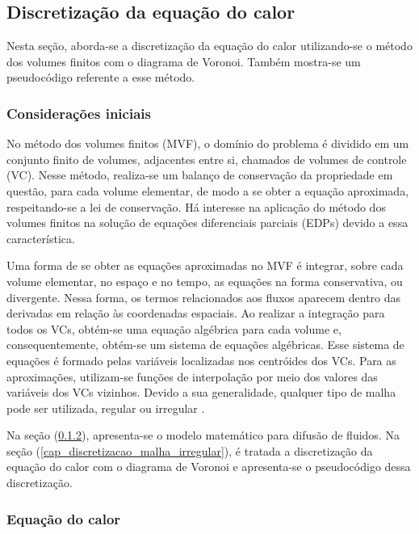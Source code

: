 \subsection{Discretização da equação do calor}
\label{cap_discretizacao_equacao_calor}

Nesta seção, aborda-se a discretização da equação do calor utilizando-se o método dos volumes finitos com o diagrama de Voronoi. Também mostra-se um pseudocódigo referente a esse método.

\subsubsection{Considerações iniciais}

No método dos volumes finitos (MVF), o domínio do problema é dividido em um conjunto finito de volumes, adjacentes entre si, chamados de volumes de controle (VC). Nesse método, realiza-se um balanço de conservação da propriedade em questão, para cada volume elementar, de modo a se obter a equação aproximada, respeitando-se a lei de conservação. Há interesse na aplicação do método dos volumes finitos na solução de equações diferenciais parciais (EDPs) devido a essa característica.

Uma forma de se obter as equações aproximadas no MVF é integrar, sobre cada volume elementar, no espaço e no tempo, as equações na forma conservativa, ou divergente. Nessa forma, os termos relacionados aos fluxos aparecem dentro das derivadas em relação às coordenadas espaciais. Ao realizar a integração para todos os VCs, obtém-se uma equação algébrica para cada volume e, consequentemente, obtém-se um sistema de equações algébricas. Esse sistema de equações é formado pelas variáveis localizadas nos centróides dos VCs. Para as aproximações, utilizam-se funções de interpolação por meio dos valores das variáveis dos VCs vizinhos. Devido a sua generalidade, qualquer tipo de malha pode ser utilizada, regular ou irregular \cite[p. 27 - 33]{Maliska2010}.

Na seção (\ref{cap_equacao_calor}), apresenta-se o modelo matemático para difusão de fluidos. Na seção (\ref{cap_discretizacao_malha_irregular}), é tratada a discretização da equação do calor com o diagrama de Voronoi e apresenta-se o pseudocódigo dessa discretização.

\subsubsection{Equação do calor}\label{cap_equacao_calor}

